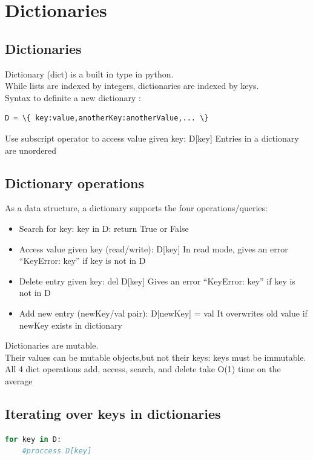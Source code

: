 \documentclass[12pt,oneside]{book}
\begin{document}
\section{Dictionaries}
\subsection{Dictionaries}
Dictionary (dict) is a built in type in python. \\
While lists are indexed by integers, dictionaries are indexed by keys.\\
Syntax to definite a new dictionary :
\begin{lstlisting}[language=python]
D = \{ key:value,anotherKey:anotherValue,... \}
\end{lstlisting}
Use subscript operator to access value given key: D[key]
Entries in a dictionary are unordered
\subsection{Dictionary operations}
As a data structure, a dictionary supports the four operations/queries:
\begin{itemize}
	\item Search for key: key in D: return True or False
	\item Access value given key (read/write): D[key] In read mode, gives an error “KeyError: key” if key is not in D
	\item Delete entry given key: del D[key] Gives an error “KeyError: key” if key is not in D
	\item Add new entry (newKey/val pair): D[newKey] = val It overwrites old value if newKey exists in dictionary
\end{itemize}
Dictionaries are mutable.\\
Their values can be mutable objects,but not their keys: keys must be immutable.\\
All 4 dict operations add, access, search, and delete take O(1) time on the average
\subsection{Iterating over keys in dictionaries}
{\small\begin{lstlisting}[language=python]
for key in D: 
	#proccess D[key]
\end{lstlisting}}
\end{document}
